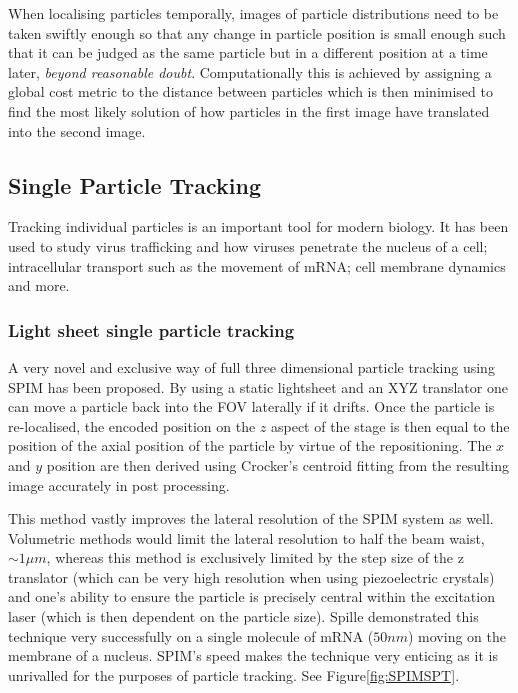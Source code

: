 When localising particles temporally, images of particle distributions need to be taken swiftly enough so that any change in particle position is small enough such that it can be judged as the same particle but in a different position at a  time later, \textit{beyond reasonable doubt}.
Computationally this is achieved by assigning a global cost metric to the distance between particles which is then minimised to find the most likely solution of how particles in the first image have translated into the second image.

\subsection{Single Particle Tracking}

Tracking individual particles is an important tool for modern biology.
It has been used to study virus trafficking and how viruses penetrate the nucleus of a cell\cite{Brandenburg2007}; intracellular transport such as the movement of mRNA\cite{Spille2015a}; cell membrane dynamics\cite{Cognet2014} and more.


\subsubsection{Light sheet single particle tracking}

A very novel and exclusive way of full three dimensional particle tracking using SPIM has been proposed.
By using a static lightsheet and an XYZ translator one can move a particle back into the FOV laterally if it drifts.
Once the particle is re-localised, the encoded position on the \(z\) aspect of the stage is then equal to the position of the axial position of the particle by virtue of the repositioning.
The \(x\) and \(y\) position are then derived using Crocker's centroid fitting from the resulting image accurately in post processing.

This method vastly improves the lateral resolution of the SPIM system as well.
Volumetric methods would limit the lateral resolution to half the beam waist, \(\sim 1 \mu m\), whereas this method is exclusively limited by the step size of the z translator (which can be very high resolution when using piezoelectric crystals) and one's ability to ensure the particle is precisely central within the excitation laser (which is then dependent on the particle size).
Spille demonstrated this technique very successfully on a single molecule of mRNA (\(50 nm\)\cite{Spille2015a}) moving on the membrane of a nucleus\cite{Spille2015a}.
SPIM's speed makes the technique very enticing as it is unrivalled for the purposes of particle tracking.
See Figure\ref{fig:SPIMSPT}.

